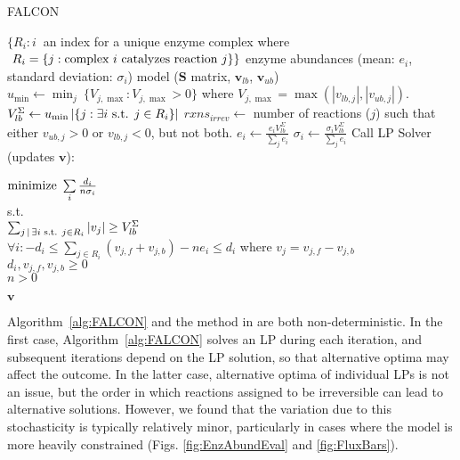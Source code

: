 \begin{algorithm}
\caption{FALCON}
\label{alg:FALCON}
\begin{algorithmic}
\INPUT $\{R_i : i\ $ an index for a unique enzyme complex where\\ 
        $\ R_i = \{ j: \textnormal{{}complex}\ i \textnormal{{ }catalyzes reaction{ }} j\}\}
       $
\INPUT enzyme abundances (mean: $e_i$, standard deviation: $\sigma_i$)
\INPUT model ($\mathbf{S}$ matrix, $\mathbf{v}_{lb}$, $\mathbf{v}_{ub}$)
\State $u_{\min} \leftarrow \min_j\ \{V_{j,\max} : V_{j,\max} > 0\}$
       where $V_{j,\max} = \max\left(\left|v_{lb,j}\right|, \left|v_{ub,j}\right|\right)$.
\State $V_{lb}^{\Sigma} \leftarrow u_{\min} \left|\{j : \exists i
       \textnormal{{ }s.t.{ }} j\in R_i\}\right|$
\State $rxns_{irrev} \leftarrow $ number of reactions ($j$) such that either 
$v_{ub,j} > 0$ or $v_{lb,j} < 0$, but not both. 
  \State $e_i \leftarrow \frac{e_i V_{lb}^{\Sigma}}
    {\sum\limits_{j} e_i}$ 
  \State $\sigma_i \leftarrow \frac{\sigma_i V_{lb}^{\Sigma}}
    {\sum\limits_{j} e_i}$
\EndFor
{}
  \State Call LP Solver (updates $\mathbf{v}$):
  \State \hspace{4.8mm} \parbox[t]{\dimexpr\linewidth-\algorithmicindent}{
    $\textnormal{minimize}\ \sum\limits_i \frac{d_i}{n \sigma_i}$\\
    s.t.\\
    $\sum_{j \,\mid\,\exists i \textnormal{{ }s.t.{ }} j\in R_i} \left|v_j\right| 
      \geq V_{lb}^{\Sigma}$\\ 
    $\forall i: -d_i \leq \sum\nolimits_{j \in R_i} (v_{j,f} +
    v_{j,b}) - n e_i \leq d_i$ where $v_j = v_{j,f} - v_{j,b}$\\
    $d_i, v_{j,f}, v_{j,b} \geq 0$\\ 
    $n > 0$
    \strut}
  \EndFor
\EndWhile
\OUTPUT $\mathbf{v}$
\end{algorithmic}
\end{algorithm}


Algorithm~\ref{alg:FALCON} and the method in \citealt{Lee2012} are
both non-deterministic. In the first case, Algorithm~\ref{alg:FALCON}
solves an LP during each iteration, and subsequent iterations depend
on the LP solution, so that alternative optima may affect the outcome.
In the latter case, alternative optima of individual LPs is not an
issue, but the order in which reactions assigned to be irreversible can
lead to alternative solutions. However, we
found that the variation due to this stochasticity is typically 
relatively minor, particularly in cases where the model is more 
heavily constrained (\suppOrApp Figs. \ref{fig:EnzAbundEval} and 
\ref{fig:FluxBars}).

